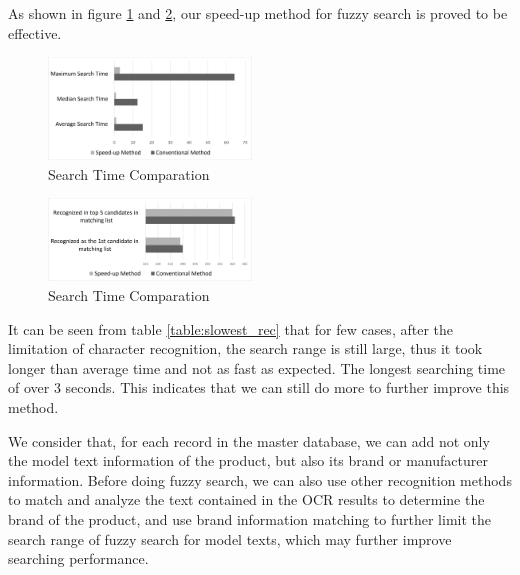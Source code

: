 \documentclass[technicalreport]{ieicej}
\begin{document}
    As shown in figure \ref{fig:graph-time} and \ref{fig:graph-recognized}, our speed-up method for fuzzy search is proved to be effective.

    \begin{figure}[t] 
        \begin{center}
        \includegraphics[width=0.48\textwidth]{figure/graph-time.pdf}
        \end{center}
        \caption{Search Time Comparation}
        \label{fig:graph-time}
    \end{figure}

    \begin{figure}[t] 
        \begin{center}
        \includegraphics[width=0.48\textwidth]{figure/graph-recognized.pdf}
        \end{center}
        \caption{Search Time Comparation}
        \label{fig:graph-recognized}
    \end{figure}
    
    It can be seen from table \ref{table:slowest_rec} that for few cases, after the limitation of character recognition, the search range is still large, thus it took longer than average time and not as fast as expected. The longest searching time of over 3 seconds. This indicates that we can still do more to further improve this method.
    
    We consider that, for each record in the master database, we can add not only the model text information of the product, but also its brand or manufacturer information. Before doing fuzzy search, we can also use other recognition methods to match and analyze the text contained in the OCR results to determine the brand of the product, and use brand information matching to further limit the search range of fuzzy search for model texts, which may further improve searching performance.
\end{document}

